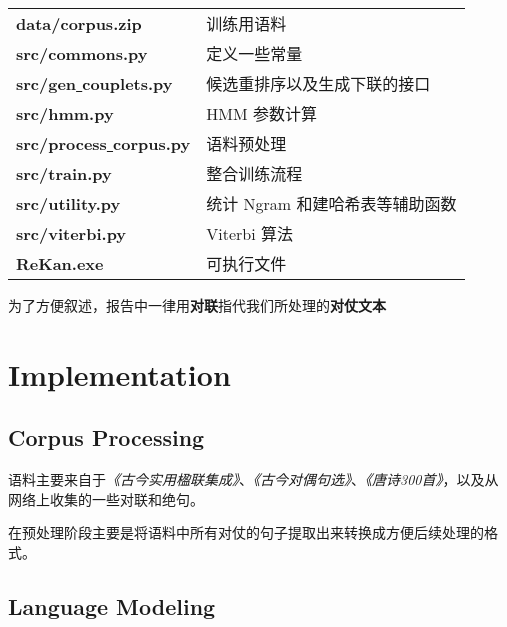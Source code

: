 \documentclass[12pt]{article}
\begin{document}
\begin{table}[ht!]
\centering
\begin{tabular}{ll}
{\bf data/corpus.zip}                   & 训练用语料                                 \\
{\bf src/commons.py}                    & 定义一些常量                               \\
{\bf src/gen\uline{ }couplets.py}       & 候选重排序以及生成下联的接口               \\
{\bf src/hmm.py}                        & HMM 参数计算                               \\
{\bf src/process\uline{ }corpus.py}     & 语料预处理                                 \\
{\bf src/train.py}                      & 整合训练流程                               \\
{\bf src/utility.py}                    & 统计 Ngram 和建哈希表等辅助函数            \\
{\bf src/viterbi.py}                    & Viterbi 算法                               \\
{\bf ReKan.exe}                         & 可执行文件                                 \\                                       
\end{tabular}
\end{table}

为了方便叙述，报告中一律用\textbf{对联}指代我们所处理的\textbf{对仗文本}

\newpage

\section{Implementation}

\subsection{Corpus Processing}

语料主要来自于\textit{《古今实用楹联集成》}、\textit{《古今对偶句选》}、\textit{《唐诗300首》}，以及从网络上收集的一些对联和绝句。

在预处理阶段主要是将语料中所有对仗的句子提取出来转换成方便后续处理的格式。

\subsection{Language Modeling}
\end{document}

